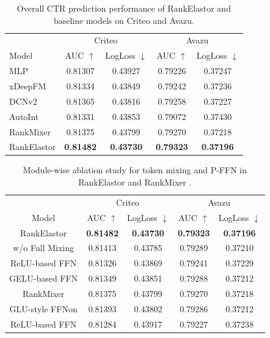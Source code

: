 \documentclass[sigconf,screen]{acmart}
\newcommand{\unimixer}{RankElastor }
\newcommand{\rankmixer}{RankMixer }
\begin{document}
\begin{table}[t]
\centering
\caption{Overall CTR prediction performance of \unimixer and baseline models on Criteo and Avazu.}
\label{tab:overall}
\begin{tabular}{lcc|cc}
\toprule
& \multicolumn{2}{c}{Criteo} & \multicolumn{2}{c}{Avazu} \\
Model & AUC $\uparrow$ & LogLoss $\downarrow$ & AUC $\uparrow$ & LogLoss $\downarrow$ \\
\midrule
MLP  & 0.81307 & 0.43927  & 0.79226 & 0.37247 \\
xDeepFM  & 0.81334 & 0.43849  & 0.79242 & 0.37236 \\
DCNv2  & 0.81365 & 0.43816  & 0.79258 & 0.37227 \\
AutoInt  & 0.81331 & 0.43853  & 0.79072 & 0.37430	\\
\rankmixer  & 0.81375 & 0.43799  & 0.79270 & 0.37218 \\ \midrule
\unimixer  & \textbf{0.81482} & \textbf{0.43730}  & \textbf{0.79323} & \textbf{0.37196} \\
\bottomrule
\end{tabular}
\end{table}


\begin{table}[t]
\centering
\caption{Module-wise ablation study for token mixing and P-FFN in \unimixer and \rankmixer.}
\label{tab:ablation}
\setlength{\tabcolsep}{2pt}
\begin{tabular}{ccc|cc}
\toprule
                 & \multicolumn{2}{c|}{Criteo}             & \multicolumn{2}{c}{Avazu}               \\
Model            & AUC $\uparrow$   & LogLoss $\downarrow$ & AUC $\uparrow$   & LogLoss $\downarrow$ \\ \midrule
\unimixer        & \textbf{0.81482} & \textbf{0.43730}     & \textbf{0.79323} & \textbf{0.37196}     \\
w/o Full Mixing  & 0.81413          & 0.43785              & 0.79289          & 0.37210              \\
ReLU-based FFN  & 0.81326          & 0.43869              & 0.79241          & 0.37229              \\
GELU-based FFN  & 0.81349          & 0.43851              & 0.79288          & 0.37212              \\ \midrule
\rankmixer       & 0.81375          & 0.43799              & 0.79270          & 0.37218              \\
GLU-style FFNon & 0.81393          & 0.43802              & 0.79286          & 0.37212              \\
ReLU-based FFN  & 0.81284          & 0.43917              & 0.79227          & 0.37238              \\ \bottomrule
\end{tabular}
\end{table}
\end{document}
